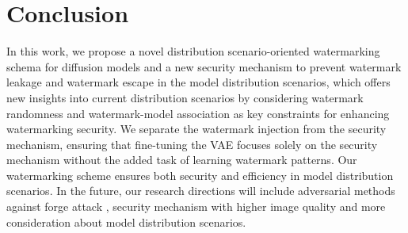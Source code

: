 
\section{Conclusion}
In this work, we propose a novel distribution scenario-oriented watermarking schema for diffusion models and a new security mechanism to prevent watermark leakage and watermark escape in the model distribution scenarios, which offers new insights into current distribution scenarios by considering watermark randomness and watermark-model association as key constraints for enhancing watermarking security. We separate the watermark injection from the security mechanism, ensuring that fine-tuning the VAE focuses solely on the security mechanism without the added task of learning watermark patterns. Our watermarking scheme ensures both security and efficiency in model distribution scenarios. In the future, our research directions will include adversarial methods against forge attack \cite{lukas2023leveraging}, security mechanism with higher image quality and more consideration about model distribution scenarios. 
